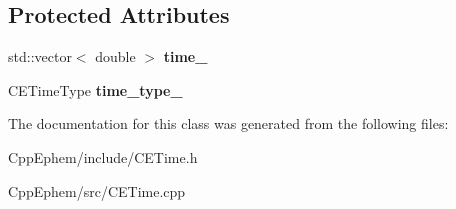 \subsection*{Protected Attributes}
\begin{DoxyCompactItemize}
\item 
\hypertarget{class_c_e_time_a6fd743f19f38b7e9e76887725fedb6e0}{}std\+::vector$<$ double $>$ {\bfseries time\+\_\+}\label{class_c_e_time_a6fd743f19f38b7e9e76887725fedb6e0}

\item 
\hypertarget{class_c_e_time_aa3d0704d43eed2d09dc4f688a78ab44b}{}C\+E\+Time\+Type {\bfseries time\+\_\+type\+\_\+}\label{class_c_e_time_aa3d0704d43eed2d09dc4f688a78ab44b}

\end{DoxyCompactItemize}


The documentation for this class was generated from the following files\+:\begin{DoxyCompactItemize}
\item 
Cpp\+Ephem/include/C\+E\+Time.\+h\item 
Cpp\+Ephem/src/C\+E\+Time.\+cpp\end{DoxyCompactItemize}
